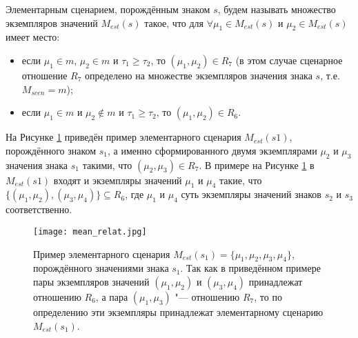 Элементарным сценарием, порождённым знаком $s$, будем называть множество экземпляров значений $M_{est}(s)$ такое, что для $\forall\mu_1\in M_{est}(s)$ и $\mu_2\in M_{est}(s)$ имеет место:
\begin{itemize}
	\item если $\mu_1\in m$, $\mu_2\in m$ и $\tau_1\geqslant\tau_2$, то $(\mu_1,\mu_2)\in R_7$ (в этом случае сценарное отношение $R_7$ определено на множестве экземпляров значения знака $s$, т.е. $M_{scen}=m$);
	\item если $\mu_1\in m$ и $\mu_2\not\in m$ и $\tau_1\geqslant\tau_2$, то $(\mu_1,\mu_2)\in R_6$.
\end{itemize}

На Рисунке \ref{fg:mean_relat} приведён пример элементарного сценария $M_{est}(s1)$, порождённого знаком $s_1$, а именно сформированного двумя экземплярами $\mu_2$ и $\mu_3$ значения знака $s_1$ такими, что $(\mu_2,\mu_3)\in R_7$. В примере на Рисунке \ref{fg:mean_relat} в $M_{est}(s1)$ входят и экземпляры значений $\mu_1$ и $\mu_4$ такие, что $\{(\mu_1,\mu_2),(\mu_3,\mu_4)\}\subseteq R_6$, где $\mu_1$ и $\mu_4$ суть экземпляры значений знаков $s_2$ и $s_3$ соответственно.

\begin{figure}[h]
	\centering
	\texttt{[image: mean\_relat.jpg]}
	\caption{Пример элементарного сценария $M_{est}(s_1)=\{\mu_1,\mu_2,\mu_3,\mu_4\}$, порождённого значениями знака $s_1$. Так как в приведённом примере пары экземпляров значений $(\mu_1,\mu_2)$ и $(\mu_3,\mu_4)$ принадлежат отношению $R_6$, а пара $(\mu_1,\mu_3)$ "--- отношению $R_7$, то по определению эти экземпляры принадлежат элементарному сценарию $M_{est}(s_1)$.}
	\label{fg:mean_relat}
\end{figure}


\clearpage